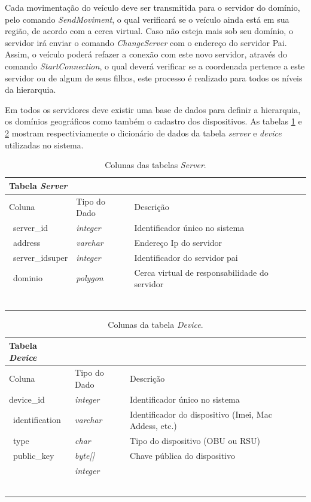 \documentclass[
	12pt,				%
	oneside,			%
	a4paper,			%
	english,			%
	brazil				%
	]{abntex2ppgsi}
\begin{document}
Cada movimentação do veículo deve ser transmitida para o servidor do domínio, pelo comando \textit{SendMoviment}, o qual verificará se o veículo ainda está em sua região, de acordo com a cerca virtual. Caso não esteja mais sob seu domínio, o servidor irá enviar o comando \textit{ChangeServer} com o endereço do servidor Pai. Assim, o veículo poderá refazer a conexão com este novo servidor, através do comando \textit{StartConnection}, o qual deverá verificar se a coordenada pertence a este servidor ou de algum de seus filhos, este processo é realizado para todos os níveis da hierarquia.

Em todos os servidores deve existir uma base de dados para definir a hierarquia, os domínios geográficos como também o cadastro dos dispositivos. As tabelas \ref{tab:serverTable} e \ref{tab:deviceTable} mostram respectiviamente o dicionário de dados da tabela \textit{server} e \textit{device} utilizadas no sistema.

\begin{longtable}{ p{}  p{}   p{}  p{}} 
	\hline
	\rowcolor[gray]{0.7}
	Tabela \textit{Server}	& 	&  \\ \hline
	\rowcolor[gray]{0.7}
	Coluna	& Tipo do Dado	& Descrição \\ \
	server\_id	& \textit{integer} & Identificador único no sistema 	\\ \
	address	& \textit{varchar}	& Endereço Ip do servidor \\ \
	server\_idsuper	& \textit{integer} & Identificador do servidor pai 	\\ \	
	dominio	& \textit{polygon} & Cerca virtual de responsabilidade do servidor	\\ \	\\ \hline
	\caption{Colunas das tabelas \textit{Server}. } %
	\label{tab:serverTable}
\end{longtable}

\begin{longtable}{ p{.20\textwidth}  p{.15\textwidth}   p{.40\textwidth}  p{.20\textwidth}} 
	\hline
	\rowcolor[gray]{0.7}
	Tabela \textit{Device}	& 	&  \\ \hline
	\rowcolor[gray]{0.7}	
	Coluna	& Tipo do Dado	& Descrição \\ \hline
	device\_id	& \textit{integer} & Identificador único no sistema	\\ \
    identification	& \textit{varchar} & Identificador do dispositivo (Imei, Mac Addess, etc.)	\\ \
    type	& \textit{char} & Tipo do dispositivo (OBU ou RSU)	\\ \
    public\_key	& \textit{byte[]} &  Chave pública do dispositivo	\\ \
		& \textit{integer} & 	\\ \	\\ \hline
	\caption{Colunas da tabela \textit{Device}. } %
	\label{tab:deviceTable}
\end{longtable}
\end{document}
